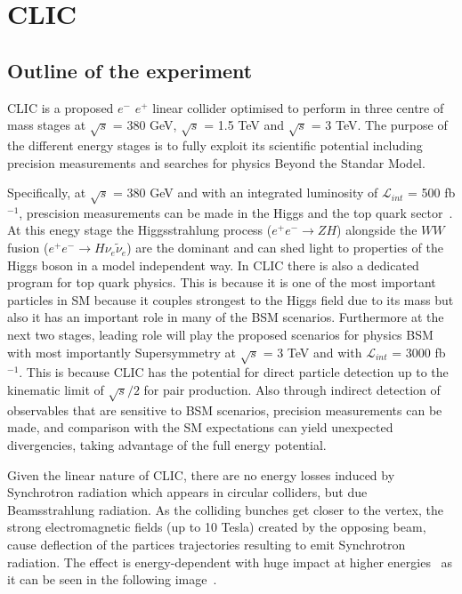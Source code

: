 \documentclass[12pt,a4paper]{report}
\begin{document}
\chapter{CLIC}

\section{Outline of the experiment}

CLIC is a proposed $e^{-}$ $e^{+}$ linear collider optimised to perform in three centre of mass stages at 
$\surd s$ = 380 GeV, $\surd s$ = 1.5 TeV and $\surd s$ = 3 TeV. The purpose of the different energy stages is to 
fully exploit its scientific potential including precision measurements and searches for physics Beyond the 
Standar Model.

Specifically, at $\surd s$ = 380 GeV and with an integrated luminosity of $\mathcal{L}_{int}$ = 500 fb$^{-1}$, 
prescision measurements can be made in the Higgs and the top quark sector~\cite{clic2016updated}.
At this enegy stage the Higgsstrahlung
process ($e^{+}e^{-}\rightarrow ZH$) alongside the $WW$ fusion ($e^{+}e^{-}\rightarrow H\nu_{e}\tilde{\nu}_{e}$) 
are the dominant and can shed light to properties of the Higgs boson in a model independent way.
In CLIC there is also a dedicated program for top quark physics. This is because it is one of the most important particles
in SM because it couples strongest to the Higgs field due to its mass but also it has an important role in 
many of the BSM scenarios.
Furthermore at the next two stages, leading role will play the proposed scenarios for physics BSM with most 
importantly Supersymmetry at $\surd s$ = 3 TeV and with $\mathcal{L}_{int}$ = 3000 fb$^{-1}$. This  is because CLIC has the potential for direct particle detection up to the 
kinematic limit of $\surd s /2$ for pair production. Also through indirect detection of observables that are sensitive to BSM
scenarios, precision measurements can be made, and comparison with the SM expectations can yield unexpected 
divergencies, 
taking advantage of the full energy potential.



Given the linear nature of CLIC, there are no energy losses induced by Synchrotron radiation which appears in 
circular colliders, but due Beamsstrahlung radiation. As the colliding bunches get closer to the 
vertex, the strong electromagnetic fields (up to 10 Tesla) created by the opposing beam, cause deflection
of the partices trajectories resulting to emit Synchrotron radiation. The effect is energy-dependent with huge
impact at higher energies~\cite{bonvicini1989first} as it can be seen in the following 
image~\cite{abramowicz2017higgs}.
\end{document}
